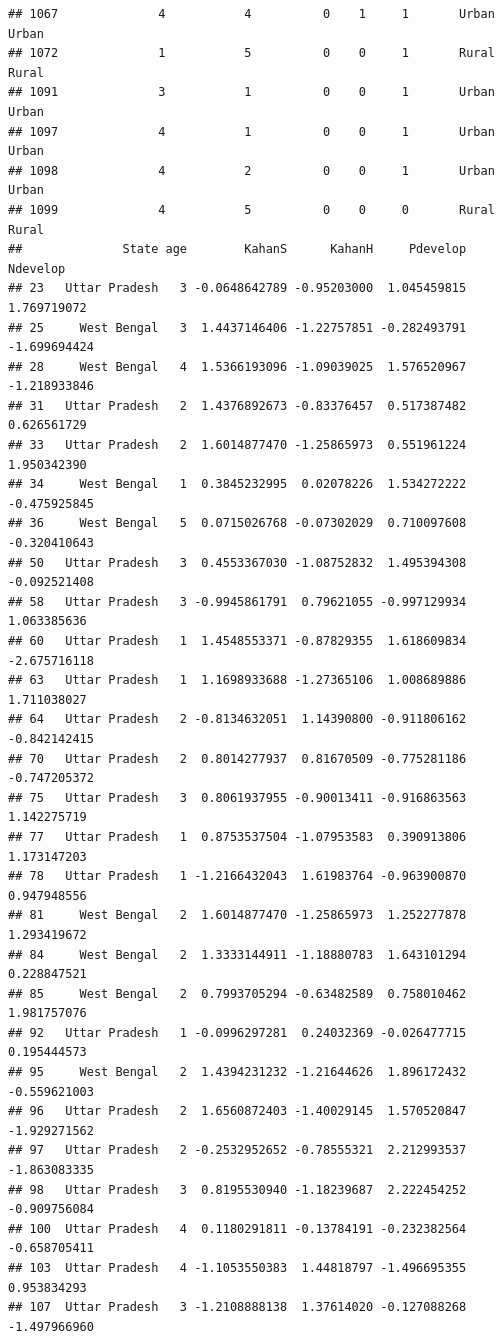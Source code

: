 \documentclass[
]{article}
\begin{document}
\begin{verbatim}
## 1067              4           4          0    1     1       Urban Urban
## 1072              1           5          0    0     1       Rural Rural
## 1091              3           1          0    0     1       Urban Urban
## 1097              4           1          0    0     1       Urban Urban
## 1098              4           2          0    0     1       Urban Urban
## 1099              4           5          0    0     0       Rural Rural
##              State age        KahanS      KahanH     Pdevelop     Ndevelop
## 23   Uttar Pradesh   3 -0.0648642789 -0.95203000  1.045459815  1.769719072
## 25     West Bengal   3  1.4437146406 -1.22757851 -0.282493791 -1.699694424
## 28     West Bengal   4  1.5366193096 -1.09039025  1.576520967 -1.218933846
## 31   Uttar Pradesh   2  1.4376892673 -0.83376457  0.517387482  0.626561729
## 33   Uttar Pradesh   2  1.6014877470 -1.25865973  0.551961224  1.950342390
## 34     West Bengal   1  0.3845232995  0.02078226  1.534272222 -0.475925845
## 36     West Bengal   5  0.0715026768 -0.07302029  0.710097608 -0.320410643
## 50   Uttar Pradesh   3  0.4553367030 -1.08752832  1.495394308 -0.092521408
## 58   Uttar Pradesh   3 -0.9945861791  0.79621055 -0.997129934  1.063385636
## 60   Uttar Pradesh   1  1.4548553371 -0.87829355  1.618609834 -2.675716118
## 63   Uttar Pradesh   1  1.1698933688 -1.27365106  1.008689886  1.711038027
## 64   Uttar Pradesh   2 -0.8134632051  1.14390800 -0.911806162 -0.842142415
## 70   Uttar Pradesh   2  0.8014277937  0.81670509 -0.775281186 -0.747205372
## 75   Uttar Pradesh   3  0.8061937955 -0.90013411 -0.916863563  1.142275719
## 77   Uttar Pradesh   1  0.8753537504 -1.07953583  0.390913806  1.173147203
## 78   Uttar Pradesh   1 -1.2166432043  1.61983764 -0.963900870  0.947948556
## 81     West Bengal   2  1.6014877470 -1.25865973  1.252277878  1.293419672
## 84     West Bengal   2  1.3333144911 -1.18880783  1.643101294  0.228847521
## 85     West Bengal   2  0.7993705294 -0.63482589  0.758010462  1.981757076
## 92   Uttar Pradesh   1 -0.0996297281  0.24032369 -0.026477715  0.195444573
## 95     West Bengal   2  1.4394231232 -1.21644626  1.896172432 -0.559621003
## 96   Uttar Pradesh   2  1.6560872403 -1.40029145  1.570520847 -1.929271562
## 97   Uttar Pradesh   2 -0.2532952652 -0.78555321  2.212993537 -1.863083335
## 98   Uttar Pradesh   3  0.8195530940 -1.18239687  2.222454252 -0.909756084
## 100  Uttar Pradesh   4  0.1180291811 -0.13784191 -0.232382564 -0.658705411
## 103  Uttar Pradesh   4 -1.1053550383  1.44818797 -1.496695355  0.953834293
## 107  Uttar Pradesh   3 -1.2108888138  1.37614020 -0.127088268 -1.497966960

\end{verbatim}
\end{document}
